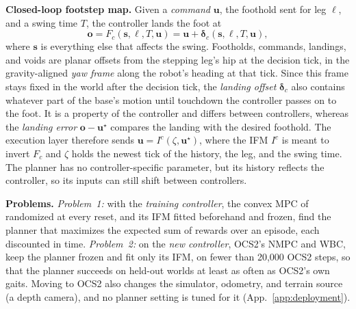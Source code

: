 \noindent\textbf{Closed-loop footstep map.}
 Given a \emph{command} $\mathbf u$, the foothold sent for
leg $\ell$, and a swing time $T$, the controller lands the foot at
\begin{equation}
  \mathbf o = F_c(\mathbf s, \ell, T, \mathbf u)
    = \mathbf u + \boldsymbol\delta_c(\mathbf s, \ell, T, \mathbf u),
  \label{eq:forward}
\end{equation}
where $\mathbf s$ is everything else that affects the swing. Footholds,
commands, landings, and voids are planar offsets from the stepping
leg's hip at the decision tick, in the gravity-aligned \emph{yaw frame}
along the robot's heading at that tick. Since this frame stays fixed in
the world after the decision tick, the \emph{landing offset}
$\boldsymbol\delta_c$ also contains whatever part of the base's motion
until touchdown the controller passes on to the foot. It is
a property of the controller and differs between controllers, whereas
the \emph{landing error} $\mathbf o - \mathbf u^\star$ compares the
landing with the desired foothold. The execution layer therefore sends
$\mathbf u = I^c(\zeta, \mathbf u^\star)$, where the IFM $I^c$ is meant
to invert $F_c$ and $\zeta$ holds the newest tick of the history, the
leg, and the swing time. The planner has no controller-specific
parameter, but its history reflects the controller, so its inputs can
still shift between controllers.

\noindent\textbf{Problems.}
 \emph{Problem~1:} with the \emph{training controller}, the
convex MPC of \citet{dicarlo_dynamic_2018} randomized at every reset,
and its IFM fitted beforehand and frozen, find the planner that maximizes the expected sum of rewards over an episode, each discounted in time. \emph{Problem~2:} on the \emph{new controller},
OCS2's NMPC and WBC, keep the planner frozen and fit only its IFM, on
fewer than 20{,}000 OCS2 steps, so that the planner succeeds on held-out
worlds at least as often as OCS2's own gaits. Moving to OCS2 also
changes the simulator, odometry, and terrain source (a depth camera),
and no planner setting is tuned for it (App.~\ref{app:deployment}).

